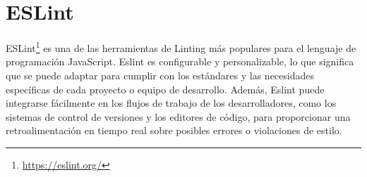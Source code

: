 \section{ESLint}\label{sec:eslint}
ESLint\footnote{\url{https://eslint.org/}} es una de las herramientas de Linting más populares para el lenguaje de programación JavaScript. Eslint es configurable y personalizable, lo que significa que se puede adaptar para cumplir con los estándares y las necesidades específicas de cada proyecto o equipo de desarrollo. Además, Eslint puede integrarse fácilmente en los flujos de trabajo de los desarrolladores, como los sistemas de control de versiones y los editores de código, para proporcionar una retroalimentación en tiempo real sobre posibles errores o violaciones de estilo.